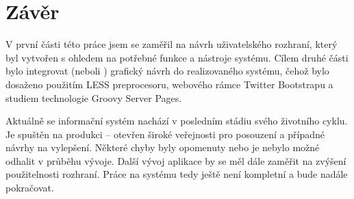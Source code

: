 \chapter{Závěr}

V první části této práce jsem se zaměřil na návrh uživatelského rozhraní, který byl vytvořen s ohledem na potřebné funkce a nástroje systému. Cílem druhé části bylo integrovat (neboli ) grafický návrh do realizovaného systému, čehož bylo dosaženo použitím LESS preprocesoru, webového rámce Twitter Bootstrapu a studiem technologie Groovy Server Pages.

Aktuálně se informační systém nachází v posledním stádiu svého životního cyklu. Je spuštěn na produkci -- otevřen široké veřejnosti pro posouzení a případné návrhy na vylepšení. Některé chyby byly opomenuty nebo je nebylo možné odhalit v průběhu vývoje. Další vývoj aplikace by se měl dále zaměřit na zvýšení použitelnosti rozhraní. Práce na systému tedy ještě není kompletní a bude nadále pokračovat.
